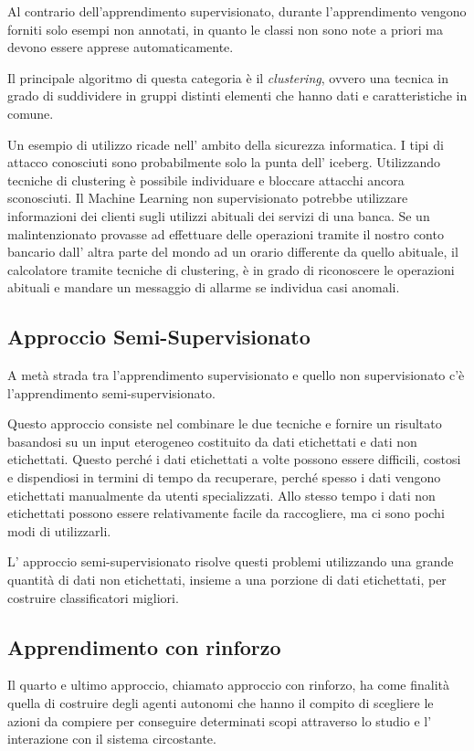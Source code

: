 \documentclass[a4paper,12pt]{report}
\begin{document}
Al contrario dell'apprendimento supervisionato, durante l'apprendimento vengono forniti solo esempi non annotati, in quanto le classi non sono note a priori ma devono essere apprese automaticamente.

\bigskip

Il principale algoritmo di questa categoria è il \textit{clustering}, ovvero una tecnica in grado di suddividere in gruppi distinti elementi che hanno dati e caratteristiche in comune.

Un esempio di utilizzo ricade nell' ambito della sicurezza informatica. I tipi di attacco conosciuti sono probabilmente solo la punta dell' iceberg. Utilizzando tecniche di clustering è possibile individuare e bloccare attacchi ancora sconosciuti.
Il Machine Learning non supervisionato potrebbe utilizzare informazioni dei clienti sugli utilizzi abituali dei servizi di una banca. Se un malintenzionato provasse ad effettuare delle operazioni tramite il nostro conto bancario dall' altra parte del mondo ad un orario differente da quello abituale, il calcolatore tramite tecniche di clustering, è in grado di riconoscere le operazioni abituali e mandare un messaggio di allarme se individua casi anomali.

\subsection*{Approccio Semi-Supervisionato}
A metà strada tra l'apprendimento supervisionato e quello non supervisionato c'è l'apprendimento semi-supervisionato.

Questo approccio consiste nel combinare le due tecniche e fornire un risultato basandosi su un input eterogeneo costituito da dati etichettati e dati non etichettati.
Questo perché i dati etichettati a volte possono essere difficili, costosi e dispendiosi in termini di tempo da recuperare, perché spesso i dati vengono etichettati manualmente da utenti specializzati. Allo stesso tempo i dati non etichettati possono essere relativamente facile da raccogliere, ma ci sono pochi modi di utilizzarli. 

L' approccio semi-supervisionato risolve questi problemi utilizzando una grande quantità di dati non etichettati, insieme a una porzione di dati etichettati, per costruire classificatori migliori.

\subsection*{Apprendimento con rinforzo}
Il quarto e ultimo approccio, chiamato approccio con rinforzo, ha come finalità quella di costruire degli agenti autonomi che hanno il compito di scegliere le azioni da compiere per conseguire determinati scopi attraverso lo studio e l' interazione con il sistema circostante.
\end{document}
